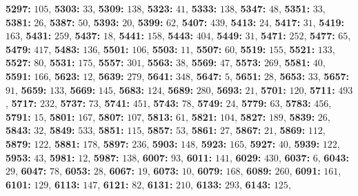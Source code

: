 \textsf{\bfseries 5297:} $105$, \textsf{\bfseries 5303:} $33$, \textsf{\bfseries 5309:} $138$, \textsf{\bfseries 5323:} $41$, \textsf{\bfseries 5333:} $138$, \textsf{\bfseries 5347:} $48$, \textsf{\bfseries 5351:} $33$, \textsf{\bfseries 5381:} $26$, \textsf{\bfseries 5387:} $50$, \textsf{\bfseries 5393:} $20$, \textsf{\bfseries 5399:} $62$, \textsf{\bfseries 5407:} $439$, \textsf{\bfseries 5413:} $24$, \textsf{\bfseries 5417:} $31$, \textsf{\bfseries 5419:} $163$, \textsf{\bfseries 5431:} $259$, \textsf{\bfseries 5437:} $18$, \textsf{\bfseries 5441:} $158$, \textsf{\bfseries 5443:} $404$, \textsf{\bfseries 5449:} $31$, \textsf{\bfseries 5471:} $252$, \textsf{\bfseries 5477:} $65$, \textsf{\bfseries 5479:} $417$, \textsf{\bfseries 5483:} $136$, \textsf{\bfseries 5501:} $106$, \textsf{\bfseries 5503:} $11$, \textsf{\bfseries 5507:} $60$, \textsf{\bfseries 5519:} $155$, \textsf{\bfseries 5521:} $133$, \textsf{\bfseries 5527:} $80$, \textsf{\bfseries 5531:} $175$, \textsf{\bfseries 5557:} $301$, \textsf{\bfseries 5563:} $38$, \textsf{\bfseries 5569:} $47$, \textsf{\bfseries 5573:} $269$, \textsf{\bfseries 5581:} $40$, \textsf{\bfseries 5591:} $166$, \textsf{\bfseries 5623:} $12$, \textsf{\bfseries 5639:} $279$, \textsf{\bfseries 5641:} $348$, \textsf{\bfseries 5647:} $5$, \textsf{\bfseries 5651:} $28$, \textsf{\bfseries 5653:} $33$, \textsf{\bfseries 5657:} $91$, \textsf{\bfseries 5659:} $133$, \textsf{\bfseries 5669:} $145$, \textsf{\bfseries 5683:} $124$, \textsf{\bfseries 5689:} $280$, \textsf{\bfseries 5693:} $21$, \textsf{\bfseries 5701:} $120$, \textsf{\bfseries 5711:} $493$, \textsf{\bfseries 5717:} $232$, \textsf{\bfseries 5737:} $73$, \textsf{\bfseries 5741:} $451$, \textsf{\bfseries 5743:} $78$, \textsf{\bfseries 5749:} $24$, \textsf{\bfseries 5779:} $63$, \textsf{\bfseries 5783:} $456$, \textsf{\bfseries 5791:} $15$, \textsf{\bfseries 5801:} $167$, \textsf{\bfseries 5807:} $107$, \textsf{\bfseries 5813:} $61$, \textsf{\bfseries 5821:} $104$, \textsf{\bfseries 5827:} $189$, \textsf{\bfseries 5839:} $26$, \textsf{\bfseries 5843:} $32$, \textsf{\bfseries 5849:} $533$, \textsf{\bfseries 5851:} $115$, \textsf{\bfseries 5857:} $53$, \textsf{\bfseries 5861:} $27$, \textsf{\bfseries 5867:} $21$, \textsf{\bfseries 5869:} $112$, \textsf{\bfseries 5879:} $122$, \textsf{\bfseries 5881:} $178$, \textsf{\bfseries 5897:} $236$, \textsf{\bfseries 5903:} $148$, \textsf{\bfseries 5923:} $165$, \textsf{\bfseries 5927:} $40$, \textsf{\bfseries 5939:} $122$, \textsf{\bfseries 5953:} $43$, \textsf{\bfseries 5981:} $12$, \textsf{\bfseries 5987:} $138$, \textsf{\bfseries 6007:} $93$, \textsf{\bfseries 6011:} $141$, \textsf{\bfseries 6029:} $430$, \textsf{\bfseries 6037:} $6$, \textsf{\bfseries 6043:} $29$, \textsf{\bfseries 6047:} $78$, \textsf{\bfseries 6053:} $28$, \textsf{\bfseries 6067:} $19$, \textsf{\bfseries 6073:} $10$, \textsf{\bfseries 6079:} $168$, \textsf{\bfseries 6089:} $260$, \textsf{\bfseries 6091:} $161$, \textsf{\bfseries 6101:} $129$, \textsf{\bfseries 6113:} $147$, \textsf{\bfseries 6121:} $82$, \textsf{\bfseries 6131:} $210$, \textsf{\bfseries 6133:} $293$, \textsf{\bfseries 6143:} $125$, 
